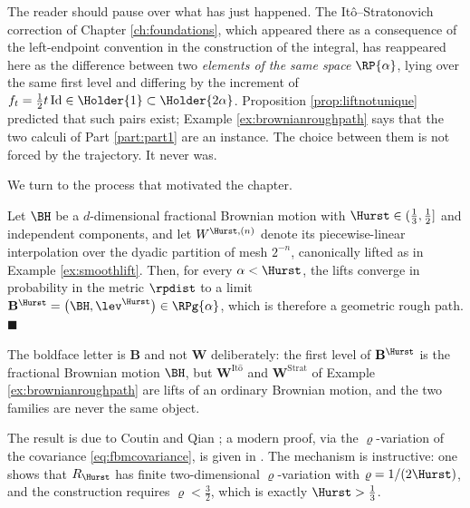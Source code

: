 The reader should pause over what has just happened. The Itô--Stratonovich correction of Chapter
\ref{ch:foundations}, which appeared there as a consequence of the left-endpoint convention in the
construction of the integral, has reappeared here as the difference between two \emph{elements of
the same space} $\RP{\alpha}$, lying over the same first level and differing by the increment of
$f_t = \tfrac12 t\,\mathrm{Id} \in \Holder{1} \subset \Holder{2\alpha}$. Proposition
\ref{prop:liftnotunique} predicted that such pairs exist; Example \ref{ex:brownianroughpath} says
that the two calculi of Part \ref{part:part1} are an instance. The choice between them is not
forced by the trajectory. It never was.

We turn to the process that motivated the chapter.

\begin{theorem}\label{thm:fbmlift}
Let $\BH$ be a $d$-dimensional fractional Brownian motion with $\Hurst \in (\tfrac13,\tfrac12]$ and
independent components, and let $W^{\Hurst,(n)}$ denote its piecewise-linear interpolation over the
dyadic partition of mesh $2^{-n}$, canonically lifted as in Example \ref{ex:smoothlift}. Then, for
every $\alpha < \Hurst$, the lifts converge in probability in the metric $\rpdist$ to a limit
$\mathbf{B}^{\Hurst} = \bigl(\BH,\lev^{\Hurst}\bigr) \in \RPg{\alpha}$, which is therefore a geometric
rough path. \hfill $\blacksquare$
\end{theorem}

The boldface letter is $\mathbf{B}$ and not $\mathbf{W}$ deliberately: the first level of
$\mathbf{B}^{\Hurst}$ is the fractional Brownian motion $\BH$, but $\mathbf{W}^{\mathrm{It\hat o}}$
and $\mathbf{W}^{\mathrm{Strat}}$ of Example \ref{ex:brownianroughpath} are lifts of an ordinary
Brownian motion, and the two families are never the same object.

The result is due to Coutin and Qian \cite{coutinqian2002}; a modern proof, via the
$\varrho$-variation of the covariance \eqref{eq:fbmcovariance}, is given in
\cite[Ch.\ 10]{frizhairer2020}. The mechanism is instructive: one shows that
$R_\Hurst$ has finite two-dimensional $\varrho$-variation with $\varrho = 1/(2\Hurst)$, and the
construction requires $\varrho < \tfrac32$, which is exactly $\Hurst > \tfrac13$.

